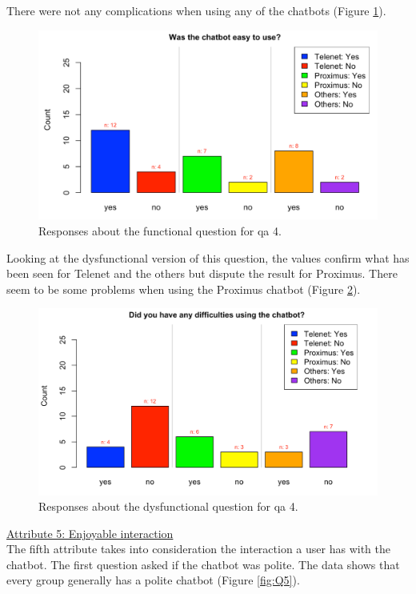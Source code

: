 \break
There were not any complications when using any of the chatbots (Figure \ref{fig:Q4}).
\begin{figure}[!htb]
	\centering
	\includegraphics[width=375pt]{../LaTeX/Figures/Comparative/Q4.png}
	\caption{Responses about the functional question for \acrshort{qa} 4.}\label{fig:Q4}
\end{figure}
\break
Looking at the dysfunctional version of this question, the values confirm what has been seen for Telenet and the others but dispute the result for Proximus. There seem to be some problems when using the Proximus chatbot (Figure \ref{fig:DQ4}).\\
\begin{figure}[!htb]
	\centering
	\includegraphics[width=375pt]{../LaTeX/Figures/Comparative/DQ4.png}
	\caption{Responses about the dysfunctional question for \acrshort{qa} 4.}\label{fig:DQ4}
\end{figure}
\break
\ul{Attribute 5: Enjoyable interaction}\\
\break
The fifth attribute takes into consideration the interaction a user has with the chatbot. The first question asked if the chatbot was polite. The data shows that every group generally has a polite chatbot (Figure \ref{fig:Q5}).\\
